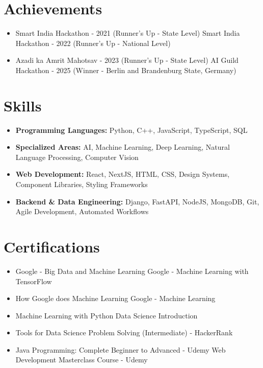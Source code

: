 \documentclass[a4paper,10pt]{article}
\begin{document}
\section*{Achievements}
\begin{itemize}
\item Smart India Hackathon - 2021 (Runner's Up - State Level) \hfill Smart India Hackathon - 2022 (Runner's Up - National Level)
\item Azadi ka Amrit Mahotsav - 2023 (Runner's Up - State Level) \hfill AI Guild Hackathon - 2025 (Winner - Berlin and Brandenburg State, Germany)
\end{itemize}

\section*{Skills}
\begin{itemize}
  \item \textbf{Programming Languages:} Python, C++, JavaScript, TypeScript, SQL
  \item \textbf{Specialized Areas:} AI, Machine Learning, Deep Learning, Natural Language Processing, Computer Vision
  \item \textbf{Web Development:} React, NextJS, HTML, CSS, Design Systems, Component Libraries, Styling Frameworks
  \item \textbf{Backend \& Data Engineering:} Django, FastAPI, NodeJS, MongoDB, Git, Agile Development, Automated Workflows
\end{itemize}

\section*{Certifications}
\begin{itemize}
\item Google - Big Data and Machine Learning \hfill Google - Machine Learning with TensorFlow
\item How Google does Machine Learning \hfill Google - Machine Learning
\item Machine Learning with Python \hfill Data Science Introduction
\item Tools for Data Science \hfill Problem Solving (Intermediate) - HackerRank
\item Java Programming: Complete Beginner to Advanced - Udemy \hfill Web Development Masterclass Course - Udemy
\end{itemize}
\end{document}
